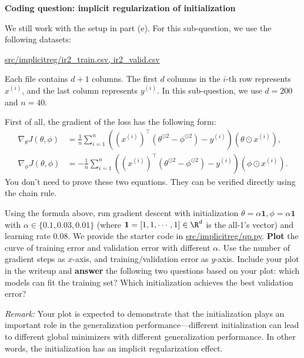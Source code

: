 \item{}\textbf{} \textbf{Coding question: implicit regularization of initialization}

We still work with the setup in part (e).
For this sub-question, we use the following datasets:
\begin{center}
	\url{src/implicitreg/ir2_train.csv, ir2_valid.csv}
\end{center}
Each file contains $d+1$ columns. The first $d$ columns in the $i$-th row represents $x^{(i)}$, and the last column represents $y^{(i)}.$ In this sub-question, we use $d=200$ and $n=40$.

First of all, the gradient of the loss has the following form:
\begin{align}
	\nabla_\theta J(\theta,\phi)&=\frac{1}{n}\sum_{i=1}^{n}((x^{(i)})^\top (\theta^{\odot 2} -\phi^{\odot 2})-y^{(i)})(\theta\odot x^{(i)}),\\
	\nabla_\phi J(\theta,\phi)&=-\frac{1}{n}\sum_{i=1}^{n}((x^{(i)})^\top (\theta^{\odot 2} -\phi^{\odot 2})-y^{(i)})(\phi\odot x^{(i)}).
\end{align}
You don't need to prove these two equations. They can be verified directly using the chain rule.

Using the formula above, run gradient descent with initialization $\theta=\alpha \mathbf{1}, \phi=\alpha\mathbf{1}$ with $\alpha\in \{0.1, 0.03, 0.01\}$ (where $\mathbf{1}=[1,1,\cdots,1]\in\R^{d}$ is the all-1's vector) and learning rate $0.08$. We provide the starter code in \url{src/implicitreg/qp.py}. \textbf{Plot} the curve of training error and validation error with different $\alpha$. Use the number of gradient steps as $x$-axis, and training/validation error as $y$-axis. Include your plot in the writeup and \textbf{answer} the following two questions based on your plot: which models can fit the training set? Which initialization achieves the best validation error? 

\textit{Remark:} Your plot is expected to demonstrate that the initialization plays an important role in the generalization performance---different initialization can lead to different global minimizers with different generalization performance. In other words, the initialization has an implicit regularization effect. 